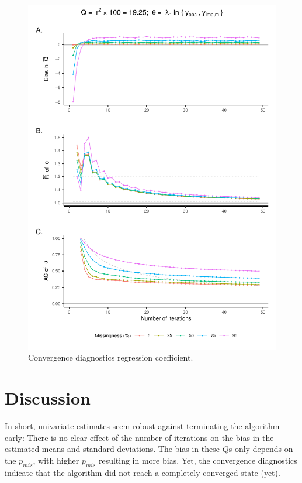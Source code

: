 \documentclass[Royal,times,sageh]{sagej}
\begin{document}
\begin{figure}

{\centering \includegraphics{manuscript_files/figure-latex/pred-1} 

}

\caption{Convergence diagnostics regression coefficient.}\label{fig:pred}
\end{figure}

\hypertarget{discussion}{%
\section{Discussion}\label{discussion}}

In short, univariate estimates seem robust against terminating the
algorithm early: There is no clear effect of the number of iterations on
the bias in the estimated means and standard deviations. The bias in
these \(Q\)s only depends on the \(p_{mis}\), with higher \(p_{mis}\)
resulting in more bias. Yet, the convergence diagnostics indicate that
the algorithm did not reach a completely converged state (yet).
\end{document}
